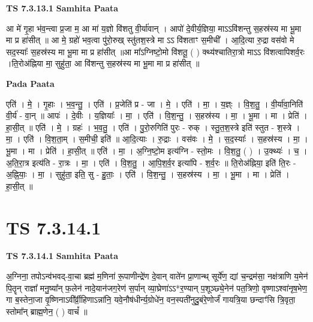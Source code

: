 \documentclass[17pt]{extarticle}
\begin{document}
\textbf{TS 7.3.13.1 } \newline
\textbf{Samhita Paata} \newline

आ मे॑ गृ॒हा भ॑व॒न्त्वा प्र॒जा म॒ आ मा॑ य॒ज्ञो वि॑शतु वी॒र्या॑वान् । आपो॑ दे॒वीर्य॒ज्ञिया॒ माऽऽवि॑शन्तु स॒हस्र॑स्य मा भू॒मा मा प्र हा॑सीत् ॥ आ मे॒ ग्रहो॑ भव॒त्वा पु॑रो॒रुख् स्तु॑तश॒स्त्रे मा ऽऽ वि॑शताꣳ स॒मीची᳚ । आ॒दि॒त्या रु॒द्रा वस॑वो मे सद॒स्याः᳚ स॒हस्र॑स्य मा भू॒मा मा प्र हा॑सीत् ॥आ मा᳚ऽग्निष्टो॒मो वि॑शतू॒ ( ) क्थ्य॑श्चातिरा॒त्रो माऽऽ वि॑शत्वापिशर्व॒रः ।ति॒रोअ॑ह्निया मा॒ सुहु॑ता॒ आ वि॑शन्तु स॒हस्र॑स्य मा भू॒मा मा प्र हा॑सीत् ॥ \newline

\textbf{Pada Paata} \newline

एति॑ । मे॒ । गृ॒हाः । भ॒व॒न्तु॒ । एति॑ । प्र॒जेति॑ प्र - जा । मे॒ । एति॑ । मा॒ । य॒ज्ञ्ः । वि॒श॒तु॒ । वी॒र्या॑वा॒निति॑ वी॒र्य॑ - वा॒न् ॥ आपः॑ । दे॒वीः । य॒ज्ञियाः᳚ । मा॒ । एति॑ । वि॒श॒न्तु॒ । स॒हस्र॑स्य । मा॒ । भू॒मा । मा । प्रेति॑ । हा॒सी॒त् ॥ एति॑ । मे॒ । ग्रहः॑ । भ॒व॒तु॒ । एति॑ । पु॒रो॒रुगिति॑ पुरः - रुक् । स्तु॒त॒श॒स्त्रे इति॑ स्तुत - श॒स्त्रे । मा॒ । एति॑ । वि॒श॒ता॒म् । स॒मीची॒ इति॑ ॥ आ॒दि॒त्याः । रु॒द्राः । वस॑वः । मे॒ । स॒द॒स्याः᳚ । स॒हस्र॑स्य । मा॒ । भू॒मा । मा । प्रेति॑ । हा॒सी॒त् ॥ एति॑ । मा॒ । अ॒ग्नि॒ष्टो॒म इत्य॑ग्नि - स्तो॒मः । वि॒श॒तु॒ ( ) । उ॒क्थ्यः॑ । च॒ । अ॒ति॒रा॒त्र इत्य॑ति - रा॒त्रः । मा॒ । एति॑ । वि॒श॒तु॒ । आ॒पि॒श॒र्व॒र इत्या॑पि - श॒र्व॒रः ॥ ति॒रो‌अ॑ह्निया॒ इति॑ ति॒रः - अ॒ह्नि॒याः॒ । मा॒ । सुहु॑ता॒ इति॒ सु - हु॒ताः॒ । एति॑ । वि॒श॒न्तु॒ । स॒हस्र॑स्य । मा॒ । भू॒मा । मा । प्रेति॑ । हा॒सी॒त् ॥  \newline




\section*{ TS 7.3.14.1 }

\textbf{TS 7.3.14.1 } \newline
\textbf{Samhita Paata} \newline

अ॒ग्निना॒ तपोऽन्व॑भवद्-वा॒चा ब्रह्म॑ म॒णिना॑ रू॒पाणीन्द्रे॑ण दे॒वान् वाते॑न प्रा॒णान्थ् सूर्ये॑ण॒ द्यां च॒न्द्रम॑सा॒ नक्ष॑त्राणि य॒मेन॑ पि॒तॄन् राज्ञा᳚ मनु॒ष्या᳚न् फ॒लेन॑ नादे॒यान॑जग॒रेण॑ स॒र्पान् व्या॒घ्रेणा॑ऽऽ*र॒ण्यान् प॒शूञ्छ्ये॒नेन॑ पत॒त्रिणो॒ वृष्णाऽश्वा॑नृष॒भेण॒ गा ब॒स्तेना॒जा वृ॒ष्णिनाऽवी᳚र्व्री॒हिणाऽन्ना॑नि॒ यवे॒नौष॑धीर्न्य॒ग्रोधे॑न॒ वन॒स्पती॑नुदु॒बंरे॒णोर्जं॑ गायत्रि॒या छन्दाꣳ॑सि त्रि॒वृता॒ स्तोमा᳚न् ब्राह्म॒णेन॒ ( ) वाचं᳚ ॥ \newline
\end{document}
